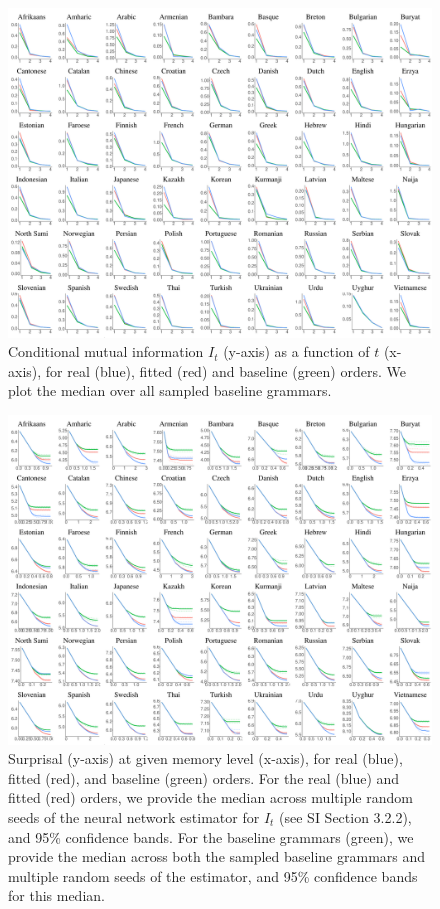 \begin{figure}
	\begin{center}
\includegraphics[width=\textwidth]{it-table-mle.pdf}
\end{center}
	\caption{Conditional mutual information $I_t$ (y-axis) as a function of $t$ (x-axis), for real (blue), fitted (red) and baseline (green) orders. We plot the median over all sampled baseline grammars.}\label{fig:it}
\end{figure}



\begin{figure}
	\begin{center}
\includegraphics[width=\textwidth]{results-table-mle.pdf}
\end{center}
	\caption{Surprisal (y-axis) at given memory level (x-axis), for real (blue), fitted (red), and baseline (green) orders.
	For the real (blue) and fitted (red) orders, we provide the median across multiple random seeds of the neural network estimator for $I_t$ (see SI Section 3.2.2), and 95\% confidence bands.
	For the baseline grammars (green), we provide the median across both the sampled baseline grammars and multiple random seeds of the estimator, and 95\% confidence bands for this median.
}\label{fig:median-table-expt2}
\end{figure}


